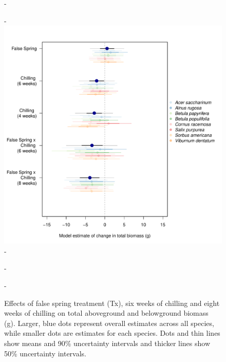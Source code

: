 \documentclass{article}\usepackage[]{graphicx}\usepackage[]{color}
\begin{document}
{\begin{figure} [H]
  -\begin{center}
  -\includegraphics[width=14cm]{..//analyses/figures/totbiomass50and90_brms.pdf} 
  -\caption{Effects of false spring treatment (Tx), six weeks of chilling and eight weeks of chilling on total aboveground and belowground biomass (g). Larger, blue dots represent overall estimates across all species, while smaller dots are estimates for each species. Dots and thin lines show means and 90\% uncertainty intervals and thicker lines show 50\% uncertainty intervals.}\label{fig:mutotbio}
  -\end{center}
  -\end{figure}}
  
\end{document}

